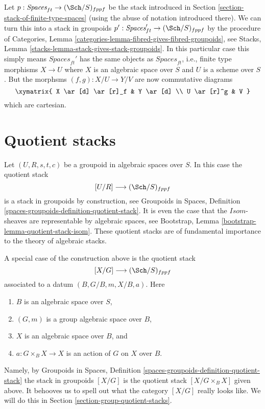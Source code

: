\noindent
Let $p : \textit{Spaces}_{ft} \to (\Sch/S)_{fppf}$ be the stack
introduced in
Section \ref{section-stack-of-finite-type-spaces}
(using the abuse of notation introduced there).
We can turn this into a stack in groupoids
$p' : \textit{Spaces}_{ft}' \to (\Sch/S)_{fppf}$ by
the procedure of
Categories, Lemma \ref{categories-lemma-fibred-gives-fibred-groupoids},
see
Stacks, Lemma \ref{stacks-lemma-stack-gives-stack-groupoids}.
In this particular case this simply means $\textit{Spaces}_{ft}'$
has the same objects as $\textit{Spaces}_{ft}$, i.e., finite type morphisms
$X \to U$ where $X$ is an algebraic space over $S$ and $U$ is a scheme
over $S$. But the morphsms $(f, g) : X/U \to Y/V$ are now
commutative diagrams
$$
\xymatrix{
X \ar[d] \ar[r]_f & Y \ar[d] \\
U \ar[r]^g & V
}
$$
which are cartesian.



\section{Quotient stacks}
\label{section-quotient-stacks}

\noindent
Let $(U, R, s, t, c)$ be a groupoid in algebraic spaces over $S$.
In this case the quotient stack
$$
[U/R] \longrightarrow (\Sch/S)_{fppf}
$$
is a stack in groupoids by construction, see
Groupoids in Spaces,
Definition \ref{spaces-groupoids-definition-quotient-stack}.
It is even the case that the $\mathit{Isom}$-sheaves are
representable by algebraic spaces, see
Bootstrap, Lemma \ref{bootstrap-lemma-quotient-stack-isom}.
These quotient stacks are of fundamental importance to the theory of
algebraic stacks.

\medskip\noindent
A special case of the construction above is the quotient stack
$$
[X/G] \longrightarrow (\Sch/S)_{fppf}
$$
associated to a datum $(B, G/B, m, X/B, a)$. Here
\begin{enumerate}
\item $B$ is an algebraic space over $S$,
\item $(G, m)$ is a group algebraic space over $B$,
\item $X$ is an algebraic space over $B$, and
\item $a : G \times_B X \to X$ is an action of $G$ on $X$ over $B$.
\end{enumerate}
Namely, by
Groupoids in Spaces,
Definition \ref{spaces-groupoids-definition-quotient-stack}
the stack in groupoids $[X/G]$ is the
quotient stack $[X/G \times_B X]$ given above. It behooves us to
spell out what the category $[X/G]$ really looks like. We will do this in
Section \ref{section-group-quotient-stacks}.



